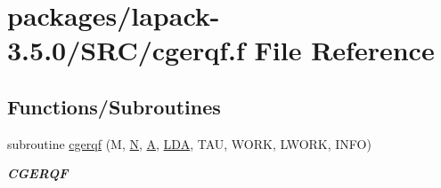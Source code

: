 \hypertarget{cgerqf_8f}{}\section{packages/lapack-\/3.5.0/\+S\+R\+C/cgerqf.f File Reference}
\label{cgerqf_8f}
\subsection*{Functions/\+Subroutines}
\begin{DoxyCompactItemize}
\item 
subroutine \hyperlink{group__complexGEcomputational_ga41b858b70f94d64cf34df25b287f1af8}{cgerqf} (M, \hyperlink{polmisc_8c_a0240ac851181b84ac374872dc5434ee4}{N}, \hyperlink{classA}{A}, \hyperlink{example__user_8c_ae946da542ce0db94dced19b2ecefd1aa}{L\+D\+A}, T\+A\+U, W\+O\+R\+K, L\+W\+O\+R\+K, I\+N\+F\+O)
\begin{DoxyCompactList}\small\item\em {\bfseries C\+G\+E\+R\+Q\+F} \end{DoxyCompactList}\end{DoxyCompactItemize}
